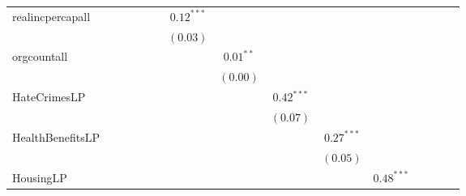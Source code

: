 \begin{table}
\begin{center}
\begin{tabular}{l c c c c c c c c c c c c c c }
realincpercapall                                          &               &              &              &              &              & $0.12^{***}$ &              &               &               &               &               &               &               &               \\
                                                          &               &              &              &              &              & $(0.03)$     &              &               &               &               &               &               &               &               \\
orgcountall                                               &               &              &              &              &              &              & $0.01^{**}$  &               &               &               &               &               &               &               \\
                                                          &               &              &              &              &              &              & $(0.00)$     &               &               &               &               &               &               &               \\
HateCrimesLP                                              &               &              &              &              &              &              &              & $0.42^{***}$  &               &               &               &               &               &               \\
                                                          &               &              &              &              &              &              &              & $(0.07)$      &               &               &               &               &               &               \\
HealthBenefitsLP                                          &               &              &              &              &              &              &              &               & $0.27^{***}$  &               &               &               &               &               \\
                                                          &               &              &              &              &              &              &              &               & $(0.05)$      &               &               &               &               &               \\
HousingLP                                                 &               &              &              &              &              &              &              &               &               & $0.48^{***}$  &               &               &               &               \\

\end{tabular}
\end{center}
\end{table}
